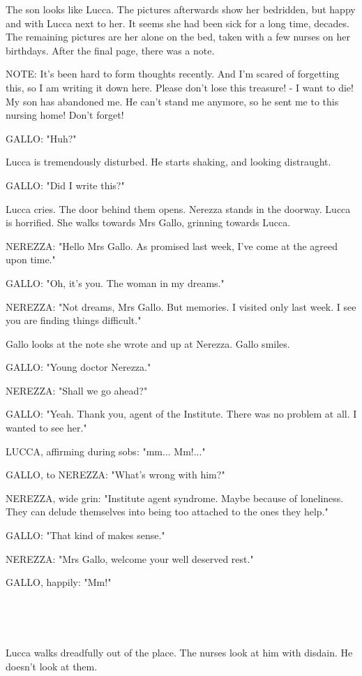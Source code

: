 \documentclass[11pt]{article}
\begin{document}
The son looks like Lucca.
The pictures afterwards show her bedridden, but happy and with Lucca next to her.
It seems she had been sick for a long time, decades.
The remaining pictures are her alone on the bed, taken with a few nurses on her birthdays.
After the final page, there was a note.

NOTE: It's been hard to form thoughts recently. 
And I'm scared of forgetting this, so I am writing it down here.
Please don't lose this treasure! - I want to die!
My son has abandoned me.
He can't stand me anymore, so he sent me to this nursing home!
Don't forget!

GALLO: "Huh?"

Lucca is tremendously disturbed.
He starts shaking, and looking distraught.

GALLO: "Did I write this?"

Lucca cries.
The door behind them opens. 
Nerezza stands in the doorway.
Lucca is horrified.
She walks towards Mrs Gallo, grinning towards Lucca.

NEREZZA: "Hello Mrs Gallo. 
As promised last week, I've come at the agreed upon time."

GALLO: "Oh, it's you.
The woman in my dreams."

NEREZZA: "Not dreams, Mrs Gallo.
But memories.
I visited only last week.
I see you are finding things difficult."

Gallo looks at the note she wrote and up at Nerezza.
Gallo smiles.

GALLO: "Young doctor Nerezza."

NEREZZA: "Shall we go ahead?"

GALLO: "Yeah. 
Thank you, agent of the Institute.
There was no problem at all.
I wanted to see her."

LUCCA, affirming during sobs: "mm... Mm!..."

GALLO, to NEREZZA: "What's wrong with him?"

NEREZZA, wide grin: "Institute agent syndrome.
Maybe because of loneliness.
They can delude themselves into being too attached to the ones they help."

GALLO: "That kind of makes sense."

NEREZZA: "Mrs Gallo, welcome your well deserved rest."

GALLO, happily: "Mm!"

\ 

\ 

Lucca walks dreadfully out of the place.
The nurses look at him with disdain.
He doesn't look at them.
\end{document}
